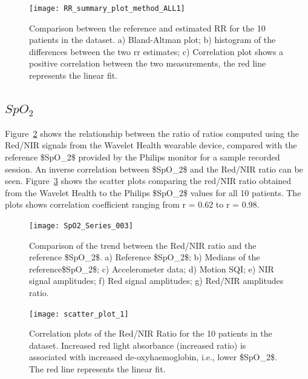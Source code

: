\begin{figure}[!ht]
    \centering
	\texttt{[image: RR\_summary\_plot\_method\_ALL1]}
	 \caption[Comparison between the reference and estimated RR for the 10 patients in the dataset.]{Comparison between the reference and estimated RR for the 10 patients in the dataset. a) Bland-Altman plot; b) histogram of the differences between the two \gls{rr} estimates; c) Correlation plot shows a positive correlation between the two measurements, the red line represents the linear fit.}
	 \label{RRsummary3} 
\end{figure}

\subsection{$SpO_2$}

Figure~\ref{spo2series} shows the relationship between the ratio of ratios computed using the Red/NIR signals from the Wavelet Health wearable device, compared with the reference  \gls{$SpO_2$} provided by the Philips monitor for a sample recorded session. An inverse correlation between \gls{$SpO_2$} and the Red/NIR ratio can be seen.
Figure~\ref{spo2_scatter} shows the scatter plots comparing the red/NIR ratio obtained from the Wavelet Health to the Philips \gls{$SpO_2$}  values for all 10 patients. The plots shows correlation coefficient  ranging from r = 0.62 to r = 0.98.


\begin{figure}[!ht]
\centering
\texttt{[image: SpO2\_Series\_003]}
    \caption[Comparison of the trend between the Red/NIR ratio and the reference \gls{$SpO_2$}.]{Comparison of the trend between the Red/NIR ratio and the reference \gls{$SpO_2$}. a) Reference \gls{$SpO_2$}; b) Medians of the reference\gls{$SpO_2$}; c) Accelerometer data; d) Motion SQI;  e) NIR signal amplitudes; f) Red signal amplitudes; g) Red/NIR amplitudes ratio.} \label{spo2series}
\end{figure}

\begin{figure}[!ht]
    \centering
\texttt{[image: scatter\_plot\_1]}
    \caption[Correlation plots of the Red/NIR Ratio for the 10 patients in the dataset.]{Correlation plots of the Red/NIR Ratio for the 10 patients in the dataset. Increased red light absorbance (increased ratio) is associated with increased de-oxyhaemoglobin, i.e., lower \gls{$SpO_2$}. The red line represents the linear fit.}
    \label{spo2_scatter} 
    
\end{figure}


